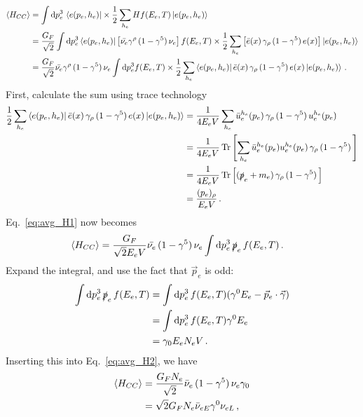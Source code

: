 \begin{align}\label{eq:avg_H1}
    \left\langle {H_{CC}} \right \rangle &= \int \dd p_e^3\, \bra{e(p_e,h_e)} \times \frac{1}{2} \sum_{h_e} H   f(E_e,T) \ket{e(p_e,h_e)} \nonumber \\
           &= \frac{G_F}{\sqrt{2}} \int \dd p_e^3 \bra{e(p_e,h_e)} \left[ \bar{\nu_e} \gamma^\rho\, (1- \gamma^5)\, \nu_e \right]  f(E_e,T) \times \frac{1}{2} \sum_{h_e} \left[\bar e(x) \,\gamma_\rho\, (1- \gamma^5)\, e(x) \right] \ket{e(p_e,h_e)} \nonumber \\
           &= \frac{G_F}{\sqrt{2}} \bar{\nu_e} \gamma^\rho\, (1- \gamma^5)\, \nu_e \int \dd p_e^3  f(E_e,T) \times \frac{1}{2} \sum_{h_e} \bra{e(p_e,h_e)} \bar e(x) \,\gamma_\rho\, (1- \gamma^5)\, e(x)   \ket{e(p_e,h_e)}\,.
\end{align}
First, calculate the sum using trace technology
\begin{align}\label{eq:helicity_sum}
    \frac{1}{2} \sum_{h_e} \bra{e(p_e,h_e)} \bar e(x) \,\gamma_\rho\, (1- \gamma^5)\, e(x)   \ket{e(p_e,h_e)} &= \frac{1}{4E_e V} \sum_{h_e} \bar{u}_e^{h_e}(p_e) \,\gamma_\rho\, (1- \gamma^5)\, u_e^{h_e}(p_e) \nonumber \\
    &= \frac{1}{4 E_e V} \Trace{\left[ \sum_{h_e} \bar{u}_e^{h_e}(p_e) u_e^{h_e}(p_e) \,\gamma_\rho\, (1- \gamma^5)\, \right]} \nonumber \\
    &= \frac{1}{4 E_e V} \Trace{\left[ (\slashed{p}_e + m_e ) \,\gamma_\rho\, (1- \gamma^5)\, \right]} \nonumber \\
    &= \frac{(p_e)_\rho}{E_e V}\,.
\end{align}
Eq.~\ref{eq:avg_H1} now becomes 
\begin{align}\label{eq:avg_H2}
    \left\langle {H_{CC}} \right \rangle &= \frac{G_F}{\sqrt{2}E_e V} \bar{\nu_e} \, (1- \gamma^5)\, \nu_e \int \dd p_e^3\, \slashed{p}_e\, f(E_e,T)\,.
\end{align}
Expand the integral, and use the fact that $\vec{p}_e$ is odd:
\begin{align}
    \int \dd p_e^3\, \slashed{p}_e\, f(E_e,T) &= \int \dd p_e^3\, f(E_e,T) (\gamma^0 E_e - \vec{p}_e \cdot \vec{\gamma}) \nonumber \\
                                              &= \int \dd p_e^3\, f(E_e,T) \gamma^0 E_e \nonumber \\
                                              &= \gamma_0 E_e N_e V\,.
\end{align}
Inserting this into Eq.~\ref{eq:avg_H2}, we have
\begin{align}
    \left\langle {H_{CC}} \right \rangle &= \frac{G_F N_e}{\sqrt{2}} \bar{\nu}_e \, (1- \gamma^5)\, \nu_e \gamma_0 \nonumber \\
            &= \sqrt{2}G_F N_e \bar{\nu}_{eE} \gamma^0 \nu_{eL}\,,
\end{align}
